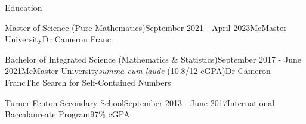 \begin{rSection}{Education}

\begin{edSubsectionFull}{Master of Science (Pure Mathematics)}{September 2021 - April 2023}{McMaster University}{}{Dr Cameron Franc}{}
\end{edSubsectionFull}



\begin{edSubsectionHonours}{Bachelor of Integrated Science (Mathematics \& Statistics)}{September 2017 - June 2021}{McMaster University}{\textit{summa cum laude} (10.8/12 cGPA)}{Dr Cameron Franc}{The Search for Self-Contained Numbers}
\end{edSubsectionHonours}


\begin{edSubsectionMin}{Turner Fenton Secondary School}{September 2013 - June 2017}{International Baccalaureate Program}{97\% cGPA}
\end{edSubsectionMin}

\end{rSection}